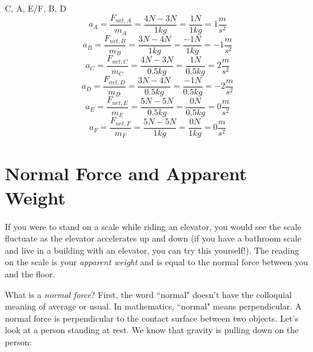 \begin{Exercise}[title = {Net Force and Acceleration}, label = netF]
\end{Exercise}

\begin{Answer}[ref = netF]
C, A, E/F, B, D
$$a_A = \frac{F_{net, A}}{m_A} = \frac{4N - 3N}{1kg} = \frac{1N}{1kg} = 1 
\frac{m}{s^2}$$
$$a_B = \frac{F_{net, B}}{m_B} = \frac{3N - 4N}{1kg} = \frac{-1N}{1kg} = -1 
\frac{m}{s^2}$$
$$a_C = \frac{F_{net, C}}{m_C} = \frac{4N - 3N}{0.5kg} = \frac{1N}{0.5kg} = 2 
\frac{m}{s^2}$$
$$a_D = \frac{F_{net, D}}{m_D} = \frac{3N - 4N}{0.5kg} = \frac{-1N}{0.5kg} = -2 
\frac{m}{s^2}$$
$$a_E = \frac{F_{net, E}}{m_E} = \frac{5N - 5N}{0.5kg} = \frac{0N}{0.5kg} = 0 
\frac{m}{s^2}$$
$$a_F = \frac{F_{net, F}}{m_F} = \frac{5N - 5N}{1kg} = \frac{0N}{1kg} = 0 
\frac{m}{s^2}$$
\end{Answer}

\section{Normal Force and Apparent Weight}
If you were to stand on a scale while riding an elevator, you would see the scale 
fluctuate as the elevator accelerates up and down (if you have a bathroom scale 
and live in a building with an elevator, you can try this yourself!). The reading 
on the scale is your \textit{apparent weight} and is equal to the normal force 
between you and the floor. 

What is a \textit{normal force}? First, the word ``normal" doesn't have the 
colloquial meaning of average or usual. In mathematics, ``normal" means 
perpendicular. A normal force is perpendicular to the contact surface between 
two objects. Let's look at a person standing at rest. We know that gravity is 
pulling down on the person:

